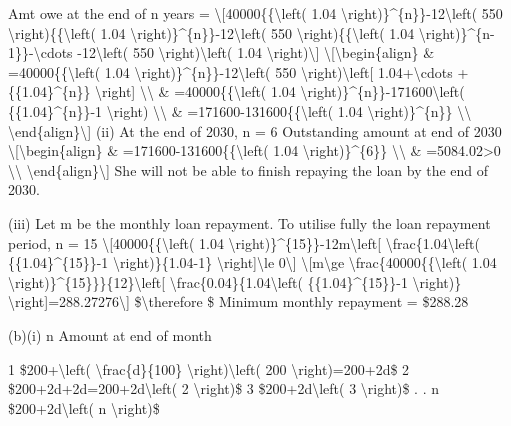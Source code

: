 Amt owe at the end of n years = \textbackslash{[}40000\{\{\textbackslash left(
1.04 \textbackslash right)\}\textasciicircum\{n\}\}-12\textbackslash left(
550 \textbackslash right)\{\{\textbackslash left( 1.04 \textbackslash right)\}\textasciicircum\{n\}\}-12\textbackslash left(
550 \textbackslash right)\{\{\textbackslash left( 1.04 \textbackslash right)\}\textasciicircum\{n-1\}\}-\textbackslash cdots
-12\textbackslash left( 550 \textbackslash right)\textbackslash left(
1.04 \textbackslash right)\textbackslash{]} \textbackslash{[}\textbackslash begin\{align\}
\& =40000\{\{\textbackslash left( 1.04 \textbackslash right)\}\textasciicircum\{n\}\}-12\textbackslash left(
550 \textbackslash right)\textbackslash left{[} 1.04+\textbackslash cdots
+\{\{1.04\}\textasciicircum\{n\}\} \textbackslash right{]} \textbackslash\textbackslash{}
\& =40000\{\{\textbackslash left( 1.04 \textbackslash right)\}\textasciicircum\{n\}\}-171600\textbackslash left(
\{\{1.04\}\textasciicircum\{n\}\}-1 \textbackslash right) \textbackslash\textbackslash{}
\& =171600-131600\{\{\textbackslash left( 1.04 \textbackslash right)\}\textasciicircum\{n\}\}
\textbackslash\textbackslash{} \textbackslash end\{align\}\textbackslash{]}
(ii) At the end of 2030, n = 6 Outstanding amount at end of 2030 \textbackslash{[}\textbackslash begin\{align\}
\& =171600-131600\{\{\textbackslash left( 1.04 \textbackslash right)\}\textasciicircum\{6\}\}
\textbackslash\textbackslash{} \& =5084.02>0 \textbackslash\textbackslash{}
\textbackslash end\{align\}\textbackslash{]} She will not be able
to finish repaying the loan by the end of 2030. 

(iii) Let m be the monthly loan repayment. To utilise fully the loan
repayment period, n = 15 \textbackslash{[}40000\{\{\textbackslash left(
1.04 \textbackslash right)\}\textasciicircum\{15\}\}-12m\textbackslash left{[}
\textbackslash frac\{1.04\textbackslash left( \{\{1.04\}\textasciicircum\{15\}\}-1
\textbackslash right)\}\{1.04-1\} \textbackslash right{]}\textbackslash le
0\textbackslash{]} \textbackslash{[}m\textbackslash ge \textbackslash frac\{40000\{\{\textbackslash left(
1.04 \textbackslash right)\}\textasciicircum\{15\}\}\}\{12\}\textbackslash left{[}
\textbackslash frac\{0.04\}\{1.04\textbackslash left( \{\{1.04\}\textasciicircum\{15\}\}-1
\textbackslash right)\} \textbackslash right{]}=288.27276\textbackslash{]}
\$\textbackslash therefore \$ Minimum monthly repayment = \$288.28 

(b)(i) n Amount at end of month

1 \$200+\textbackslash left( \textbackslash frac\{d\}\{100\} \textbackslash right)\textbackslash left(
200 \textbackslash right)=200+2d\$ 2 \$200+2d+2d=200+2d\textbackslash left(
2 \textbackslash right)\$ 3 \$200+2d\textbackslash left( 3 \textbackslash right)\$
. . n \$200+2d\textbackslash left( n \textbackslash right)\$

